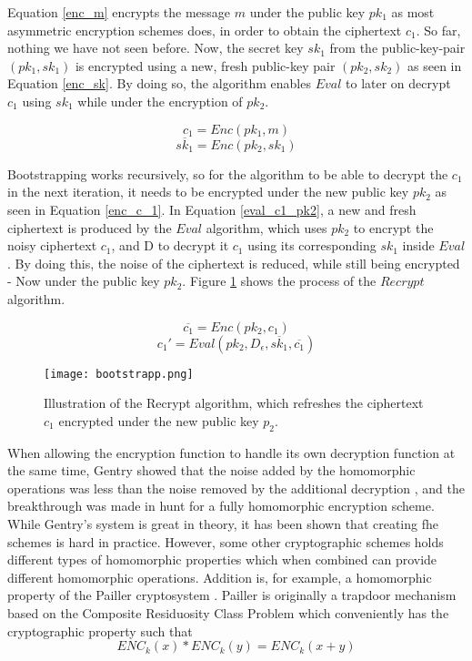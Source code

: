 Equation \ref{enc_m} encrypts the message $m$ under the public key $pk_1$ as most asymmetric encryption schemes does, in order to obtain the ciphertext $c_1$. So far, nothing we have not seen before. Now, the secret key $sk_1$ from the public-key-pair $(pk_1,sk_1)$ is encrypted using a new, fresh public-key pair $(pk_2, sk_2)$ as seen in Equation \ref{enc_sk}. By doing so, the algorithm enables $Eval$ to later on decrypt $c_1$ using $sk_1$ while under the encryption of $pk_2$.

\begin{equation}
\label{enc_m}
c_1 = Enc(pk_1, m)
\end{equation}
\begin{equation}
\label{enc_sk}
\overline{sk_1} = Enc(pk_2, sk_1)
\end{equation}


Bootstrapping works recursively, so for the algorithm to be able to decrypt the $c_1$ in the next iteration, it needs to be encrypted under the new public key $pk_2$ as seen in Equation \ref{enc_c_1}. In Equation \ref{eval_c1_pk2}, a new and fresh ciphertext is produced by the $Eval$ algorithm, which uses $pk_2$ to encrypt the noisy ciphertext $c_1$, and D to decrypt it $c_1$ using its corresponding $sk_1$ inside $Eval$. By doing this, the noise of the ciphertext is reduced, while still being encrypted - Now under the public key $pk_2$. Figure \ref{recrypt_function} shows the process of the $Recrypt$ algorithm.


\begin{equation}
\label{enc_c_1}
\overline{c_1} = Enc(pk_2, c_1)
\end{equation}
\begin{equation}
\label{eval_c1_pk2}
c_1' = Eval(pk_2, D_{\epsilon}, \overline{sk_1}, \overline{c_1})
\end{equation}


\begin{figure}[h]
	\centering
	\texttt{[image: bootstrapp.png]}
	\caption{Illustration of the Recrypt algorithm, which refreshes the ciphertext $c_1$ encrypted under the new public key $p_2$.}
	\label{recrypt_function}
\end{figure}



When allowing the encryption function to handle its own decryption function at the same time, Gentry showed that the noise added by the homomorphic operations was less than the noise removed by the additional decryption \cite{Gentry_computing_arb_func_enc_data}, and the breakthrough was made in hunt for a fully homomorphic encryption scheme. While Gentry's system is great in theory, it has been shown that creating \gls{fhe} schemes is hard in practice. However, some other cryptographic schemes holds different types of homomorphic properties which when combined can provide different homomorphic operations. Addition is, for example, a homomorphic property of the Pailler cryptosystem \citep{Paillier}. Pailler is originally a trapdoor mechanism based on the Composite Residuosity Class Problem which conveniently has the cryptographic property such that \[ENC_k(x) * ENC_k(y) = ENC_k(x + y)\]

